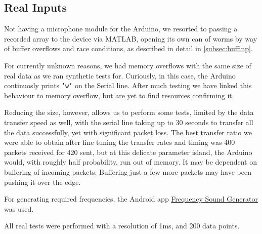 \subsection{Real Inputs}

Not having a microphone module for the Arduino, we resorted to passing a
recorded array to the device via MATLAB, opening its own can of worms by way of
buffer overflows and race conditions, as described in detail in
\autoref{subsec:buffinp}. 

For currently unknown reasons, we had memory overflows with the same size of
real data as we ran synthetic tests for. Curiously, in this case, the Arduino
continuosly prints \texttt{'w'} on the Serial line. After much testing we have
linked this behaviour to memory overflow, but are yet to find resources
confirming it. 

Reducing the size, however, allows us to perform some tests, limited by the data
transfer speed as well, with the serial line taking up to 30 seconds to transfer
all the data successfully, yet with significant packet loss. The best transfer
ratio we were able to obtain after fine tuning the transfer rates and timing was
400 packets received for 420 sent, but at this delicate parameter island, the
Arduino would, with roughly half probability, run out of memory. It may be
dependent on buffering of incoming packets. Buffering just a few more packets
may have been pushing it over the edge.

For generating required frequencies, the Android app
\href{https://play.google.com/store/apps/details?id=com.luxdelux.frequencygenerator}{Frequency
Sound Generator} was used.

All real tests were performed with a resolution of 1ms, and 200 data points.

